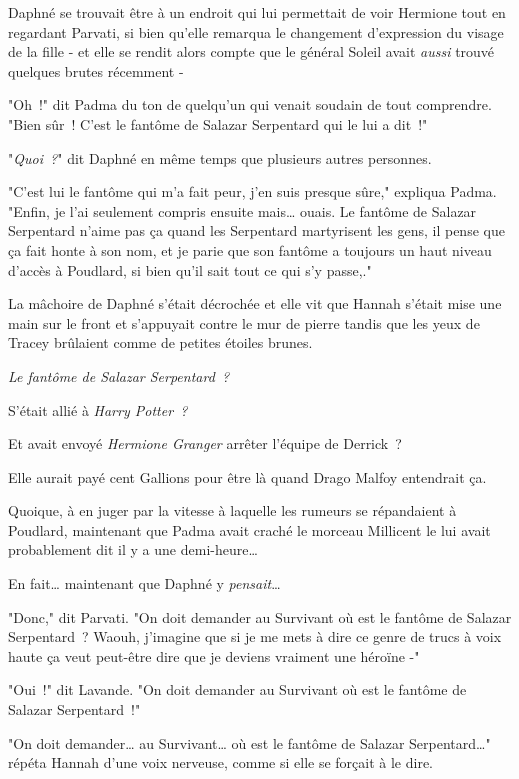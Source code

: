 Daphné se trouvait être à un endroit qui lui permettait de voir Hermione tout en regardant Parvati, si bien qu'elle remarqua le changement d'expression du visage de la fille - et elle se rendit alors compte que le général Soleil avait \emph{aussi} trouvé quelques brutes récemment -

"Oh~!" dit Padma du ton de quelqu'un qui venait soudain de tout comprendre. "Bien sûr~! C'est le fantôme de Salazar Serpentard qui le lui a dit~!"

"\emph{Quoi~?}" dit Daphné en même temps que plusieurs autres personnes.

"C'est lui le fantôme qui m'a fait peur, j'en suis presque sûre," expliqua Padma. "Enfin, je l'ai seulement compris ensuite mais… ouais. Le fantôme de Salazar Serpentard n'aime pas ça quand les Serpentard martyrisent les gens, il pense que ça fait honte à son nom, et je parie que son fantôme a toujours un haut niveau d'accès à Poudlard, si bien qu'il sait tout ce qui s'y passe,."

La mâchoire de Daphné s'était décrochée et elle vit que Hannah s'était mise une main sur le front et s'appuyait contre le mur de pierre tandis que les yeux de Tracey brûlaient comme de petites étoiles brunes.

\emph{Le fantôme de Salazar Serpentard~?}

S'était allié à \emph{Harry Potter~?}

Et avait envoyé \emph{Hermione Granger} arrêter l'équipe de Derrick~?

Elle aurait payé cent Gallions pour être là quand Drago Malfoy entendrait ça.

Quoique, à en juger par la vitesse à laquelle les rumeurs se répandaient à Poudlard, maintenant que Padma avait craché le morceau Millicent le lui avait probablement dit il y a une demi-heure…

En fait… maintenant que Daphné y \emph{pensait}…

"Donc," dit Parvati. "On doit demander au Survivant où est le fantôme de Salazar Serpentard~? Waouh, j'imagine que si je me mets à dire ce genre de trucs à voix haute ça veut peut-être dire que je deviens vraiment une héroïne -"

"Oui~!" dit Lavande. "On doit demander au Survivant où est le fantôme de Salazar Serpentard~!"

"On doit demander… au Survivant… où est le fantôme de Salazar Serpentard…" répéta Hannah d'une voix nerveuse, comme si elle se forçait à le dire.

